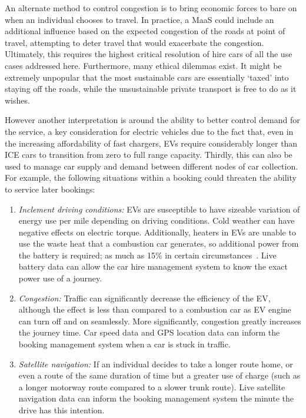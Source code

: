 \documentclass[journal]{IEEEtran}
\begin{document}
An alternate method to control congestion is to bring economic forces
to bare on when an individual chooses to travel. In practice, a MaaS
could include an additional influence based on the expected congestion
of the roads at point of travel, attempting to deter travel that would
exacerbate the congestion. Ultimately, this requires the highest
critical resolution of hire cars of all the use cases addressed
here. Furthermore, many ethical dilemmas exist. It might be extremely
unpopular that the most sustainable cars are essentially `taxed' into
staying off the roads, while the unsustainable private transport is
free to do as it wishes.

However another interpretation is around the ability to better control
demand for the service, a key consideration for electric vehicles due
to the fact that, even in the increasing affordability of fast
chargers, EVs require considerably longer than ICE cars to transition
from zero to full range capacity. Thirdly, this can also be used to
manage car supply and demand between different nodes of car
collection. For example, the following situations within a booking
could threaten the ability to service later bookings:

\begin{enumerate}
\item {\emph{Inclement driving conditions:}} EVs are susceptible to
have sizeable variation of energy use per mile depending on driving
conditions. Cold weather can have negative effects on electric
torque. Additionally, heaters in EVs are unable to use the waste heat
that a combustion car generates, so additional power from the battery
is required; as much as 15\% in certain
circumstances~\cite{dft:2008}. Live battery data can allow the car
hire management system to know the exact power use of a journey.
\item {\emph{Congestion:}} Traffic can significantly decrease the
efficiency of the EV, although the effect is less than compared to a
combustion car as EV engine can turn off and on seamlessly. More
significantly, congestion greatly increases the journey time. Car
speed data and GPS location data can inform the booking management
system when a car is stuck in traffic.
\item {\emph{Satellite navigation:}} If an individual decides to take
a longer route home, or even a route of the same duration of time but
a greater use of charge (such as a longer motorway route compared to a
slower trunk route). Live satellite navigation data can inform the
booking management system the minute the drive has this intention.
\end{enumerate}
\end{document}
